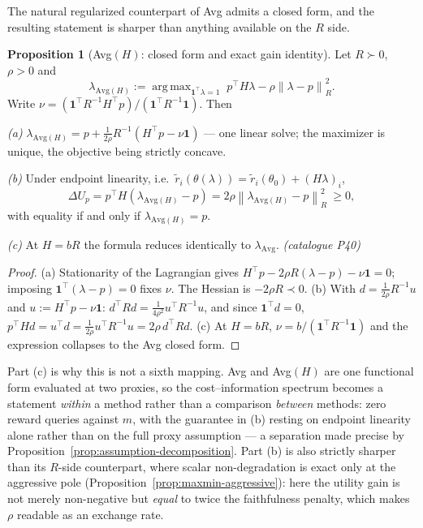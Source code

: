 \documentclass[12pt,a4paper]{report}
\newcommand{\1}{\mathbf{1}}
\newcommand{\norm}[1]{\left\lVert #1 \right\rVert}
\DeclareMathOperator*{\argmax}{arg\,max}
\theoremstyle{definition}
\newtheorem{proposition}[definition]{Proposition}
\begin{document}
The natural regularized counterpart of Avg admits a closed form, and the resulting statement is sharper than anything available on the \(R\) side.

\begin{proposition}[Avg\((H)\): closed form and exact gain identity]
\label{prop:avg-h}
Let \(R\succ0\), \(\rho>0\) and
\[
\lambda_{\mathrm{Avg}(H)}:=\argmax_{\1^\top\lambda=1}\;p^\top H\lambda-\rho\norm{\lambda-p}_R^2 .
\]
Write \(\nu=(\1^\top R^{-1}H^\top p)/(\1^\top R^{-1}\1)\). Then

\emph{(a)} \(\lambda_{\mathrm{Avg}(H)}=p+\tfrac{1}{2\rho}R^{-1}(H^\top p-\nu\1)\) --- one linear solve; the maximizer is unique, the objective being strictly concave.

\emph{(b)} Under endpoint linearity, i.e.\ \(\tilde r_i(\theta(\lambda))=\tilde r_i(\theta_0)+(H\lambda)_i\),
\[
\Delta U_p=p^\top H(\lambda_{\mathrm{Avg}(H)}-p)=2\rho\norm{\lambda_{\mathrm{Avg}(H)}-p}_R^2\ \ge 0,
\]
with equality if and only if \(\lambda_{\mathrm{Avg}(H)}=p\).

\emph{(c)} At \(H=bR\) the formula reduces identically to \(\lambda_{\mathrm{Avg}}\). \emph{(catalogue P40)}
\end{proposition}

\begin{proof}
(a) Stationarity of the Lagrangian gives \(H^\top p-2\rho R(\lambda-p)-\nu\1=0\); imposing \(\1^\top(\lambda-p)=0\) fixes \(\nu\). The Hessian is \(-2\rho R\prec0\). (b) With \(d=\tfrac{1}{2\rho}R^{-1}u\) and \(u:=H^\top p-\nu\1\): \(d^\top Rd=\tfrac{1}{4\rho^2}u^\top R^{-1}u\), and since \(\1^\top d=0\), \(p^\top Hd=u^\top d=\tfrac{1}{2\rho}u^\top R^{-1}u=2\rho\,d^\top Rd\). (c) At \(H=bR\), \(\nu=b/(\1^\top R^{-1}\1)\) and the expression collapses to the Avg closed form.
\end{proof}

Part (c) is why this is not a sixth mapping. Avg and Avg\((H)\) are one functional form evaluated at two proxies, so the cost--information spectrum becomes a statement \emph{within} a method rather than a comparison \emph{between} methods: zero reward queries against \(m\), with the guarantee in (b) resting on endpoint linearity alone rather than on the full proxy assumption --- a separation made precise by Proposition~\ref{prop:assumption-decomposition}. Part (b) is also strictly sharper than its \(R\)-side counterpart, where scalar non-degradation is exact only at the aggressive pole (Proposition~\ref{prop:maxmin-aggressive}): here the utility gain is not merely non-negative but \emph{equal} to twice the faithfulness penalty, which makes \(\rho\) readable as an exchange rate.
\end{document}
